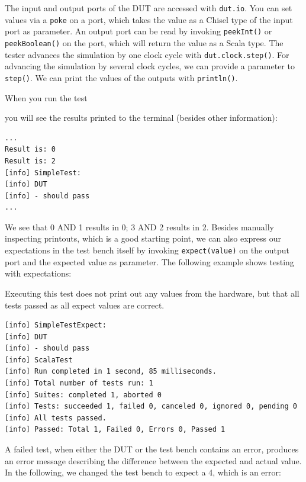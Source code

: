 \documentclass[%
    10pt,
    headinclude, footexclude,
    openright, %
    notitlepage,
    cleardoubleempty,
    headsepline,
    pointlessnumbers,
    bibtotoc, idxtotoc,
    ]{scrbook}
\newcommand{\code}[1]{{\lstinline[basicstyle=\small\ttfamily]{#1}}}
\begin{document}


The input and output ports of the DUT are accessed with \code{dut.io}.
You can set values via a \code{poke} on a port, which takes the value as a Chisel type of the
input port as parameter.
An output port can be read by invoking \code{peekInt()} or \code{peekBoolean()} on the port,
which will return the value as a Scala type.
The tester advances the simulation by one clock cycle with \code{dut.clock.step()}.
For advancing the simulation by several clock cycles, we can provide a parameter to
\code{step()}.
We can print the values of the outputs with \code{println()}.



When you run the test


\noindent you will see the results printed to the terminal
(besides other information):

\begin{verbatim}
...
Result is: 0
Result is: 2
[info] SimpleTest:
[info] DUT
[info] - should pass
...
\end{verbatim}

We see that 0 AND 1 results in 0; 3 AND 2 results in 2.
Besides manually inspecting printouts, which is a good starting point, we can also
express our expectations in the test bench itself by invoking
\code{expect(value)} on the output port and the expected value as parameter.
The following example shows testing with expectations:


Executing this test does not print out any values from the hardware,
but that all tests passed as all expect values are correct.

\begin{verbatim}
[info] SimpleTestExpect:
[info] DUT
[info] - should pass
[info] ScalaTest
[info] Run completed in 1 second, 85 milliseconds.
[info] Total number of tests run: 1
[info] Suites: completed 1, aborted 0
[info] Tests: succeeded 1, failed 0, canceled 0, ignored 0, pending 0
[info] All tests passed.
[info] Passed: Total 1, Failed 0, Errors 0, Passed 1
\end{verbatim}

A failed test, when either the DUT or the test bench contains an error,
produces an error message describing the difference between the expected and actual
value. In the following, we changed the test bench to expect a 4, which is an error:
\end{document}
